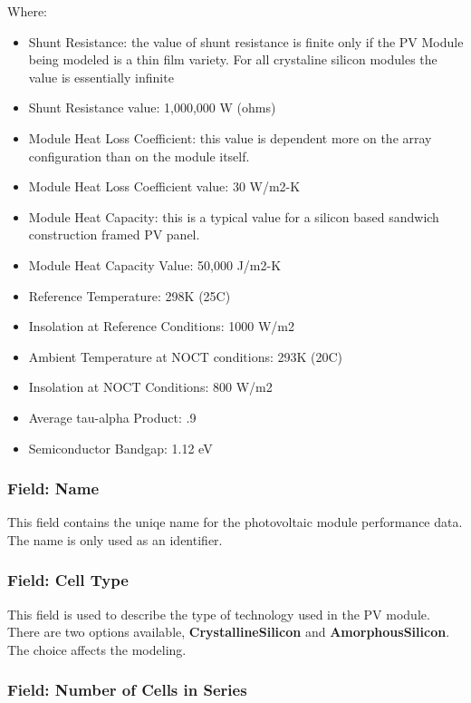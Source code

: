 Where:

\begin{itemize}
\item
  Shunt Resistance: the value of shunt resistance is finite only if the PV Module being modeled is a thin film variety. For all crystaline silicon modules the value is essentially infinite
\item
  Shunt Resistance value: 1,000,000 W (ohms)
\item
  Module Heat Loss Coefficient: this value is dependent more on the array configuration than on the module itself.
\item
  Module Heat Loss Coefficient value: 30 W/m2-K
\item
  Module Heat Capacity: this is a typical value for a silicon based sandwich construction framed PV panel.
\item
  Module Heat Capacity Value: 50,000 J/m2-K
\item
  Reference Temperature: 298K (25C)
\item
  Insolation at Reference Conditions: 1000 W/m2
\item
  Ambient Temperature at NOCT conditions: 293K (20C)
\item
  Insolation at NOCT Conditions: 800 W/m2
\item
  Average tau-alpha Product: .9
\item
  Semiconductor Bandgap: 1.12 eV
\end{itemize}

\subsubsection{Field: Name}\label{field-name-25}

This field contains the uniqe name for the photovoltaic module performance data. The name is only used as an identifier.

\subsubsection{Field: Cell Type}\label{field-cell-type}

This field is used to describe the type of technology used in the PV module. There are two options available, \textbf{CrystallineSilicon} and \textbf{AmorphousSilicon}. The choice affects the modeling.

\subsubsection{Field: Number of Cells in Series}\label{field-number-of-cells-in-series}

